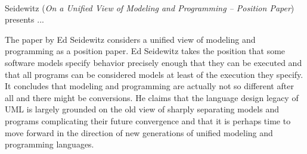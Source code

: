 

\ \hline \ %

Seidewitz
\cite{isola-2016-seidewitz}
({\em On a Unified View of Modeling and Programming -- Position Paper})
presents ...


The paper by Ed Seidewitz considers a unified view of modeling and programming as a position paper. Ed Seidewitz takes the position that some software models specify behavior precisely enough that they can be executed and that all programs can be considered models at least of the execution they specify. It concludes that modeling and programming are actually not so different after all and there might be conversions.  He claims that the language design legacy of UML is largely grounded on the old view of sharply separating models and programs complicating their future convergence and that it is perhaps time to move forward in the direction of new generations of unified modeling and programming languages.